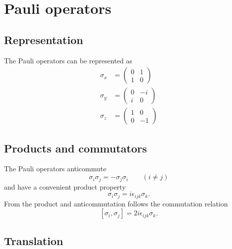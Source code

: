 
\section{Pauli operators}

\subsection{Representation}
The Pauli operators can be represented as \begin{align}
  \sigma_x &= \left( \begin{array}{cc} 0 & 1 \\ 1 & 0 \end{array} \right) \nonumber \\
  \sigma_y &= \left( \begin{array}{cc} 0 & -i \\ i & 0 \end{array} \right) \nonumber \\
  \sigma_z &= \left( \begin{array}{cc} 1 & 0 \\ 0 & -1 \end{array} \right)
\end{align}

\subsection{Products and commutators}
The Pauli operators anticommute \begin{equation}
\sigma_i \sigma_j = - \sigma_j \sigma_i \qquad (i \neq j) \end{equation}
and have a convenient product property \begin{equation}
\sigma_i \sigma_j = i \epsilon_{ijk} \sigma_k. \end{equation}
From the product and anticommutation follows the commutation relation \begin{equation}
\left[ \sigma_i, \sigma_j \right] = 2i \epsilon_{ijk} \sigma_k. \end{equation}

\subsection{Translation}

